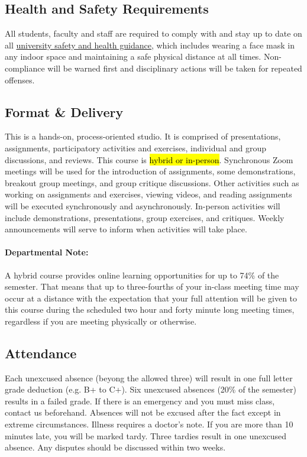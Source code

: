 \subsection{Health and Safety Requirements}

All students, faculty and staff are required to comply with and stay up to date on all \href{https://safeandhealthy.osu.edu}{university safety and health guidance}, which includes wearing a face mask in any indoor space and maintaining a safe physical distance at all times. Non-compliance will be warned first and disciplinary actions will be taken for repeated offenses.

\subsection{Format \& Delivery}

This is a hands-on, process-oriented studio. It is comprised of presentations, assignments, participatory activities and exercises, individual and group discussions, and reviews. This course is \hl{hybrid or in-person}. Synchronous Zoom meetings will be used for the introduction of assignments, some demonstrations, breakout group meetings, and group critique discussions. Other activities such as working on assignments and exercises, viewing videos, and reading assignments will be executed synchronously and asynchronously. In-person activities will include demonstrations, presentations, group exercises, and critiques. Weekly announcements will serve to inform when activities will take place.

\paragraph{Departmental Note:} A hybrid course provides online learning opportunities for up to 74\% of the semester. That means that up to three-fourths of your in-class meeting time may occur at a distance with the expectation that your full attention will be given to this course during the scheduled two hour and forty minute long meeting times, regardless if you are meeting physically or otherwise.

\subsection{Attendance}

Each unexcused absence (beyong the allowed three) will result in one full letter grade deduction (e.g. B+ to C+). Six unexcused absences (20\% of the semester) results in a failed grade. If there is an emergency and you must miss class, contact us beforehand. Absences will not be excused after the fact except in extreme circumstances. Illness requires a doctor’s note. If you are more than 10 minutes late, you will be marked tardy. Three tardies result in one unexcused absence. Any disputes should be discussed within two weeks.

